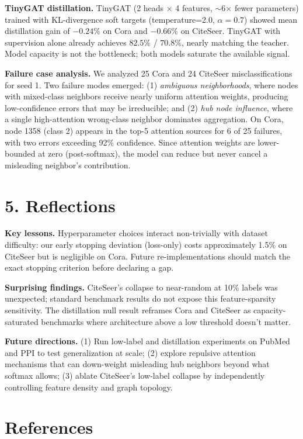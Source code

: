 \documentclass[11pt]{article}
\begin{document}
\textbf{TinyGAT distillation.} TinyGAT (2 heads $\times$ 4 features, $\sim$6$\times$ fewer parameters) trained with KL-divergence soft targets (temperature=2.0, $\alpha=0.7$) showed mean distillation gain of $-0.24\%$ on Cora and $-0.66\%$ on CiteSeer. TinyGAT with supervision alone already achieves $82.5\%$ / $70.8\%$, nearly matching the teacher. Model capacity is not the bottleneck; both models saturate the available signal.

\textbf{Failure case analysis.} We analyzed 25 Cora and 24 CiteSeer misclassifications for seed 1. Two failure modes emerged: (1) \textit{ambiguous neighborhoods}, where nodes with mixed-class neighbors receive nearly uniform attention weights, producing low-confidence errors that may be irreducible; and (2) \textit{hub node influence}, where a single high-attention wrong-class neighbor dominates aggregation. On Cora, node 1358 (class 2) appears in the top-5 attention sources for 6 of 25 failures, with two errors exceeding 92\% confidence. Since attention weights are lower-bounded at zero (post-softmax), the model can reduce but never cancel a misleading neighbor's contribution.

\section*{5. Reflections}

\textbf{Key lessons.} Hyperparameter choices interact non-trivially with dataset difficulty: our early stopping deviation (loss-only) costs approximately 1.5\% on CiteSeer but is negligible on Cora. Future re-implementations should match the exact stopping criterion before declaring a gap.

\textbf{Surprising findings.} CiteSeer's collapse to near-random at 10\% labels was unexpected; standard benchmark results do not expose this feature-sparsity sensitivity. The distillation null result reframes Cora and CiteSeer as capacity-saturated benchmarks where architecture above a low threshold doesn't matter.

\textbf{Future directions.} (1) Run low-label and distillation experiments on PubMed and PPI to test generalization at scale; (2) explore repulsive attention mechanisms that can down-weight misleading hub neighbors beyond what softmax allows; (3) ablate CiteSeer's low-label collapse by independently controlling feature density and graph topology.

\section*{References}
\end{document}
